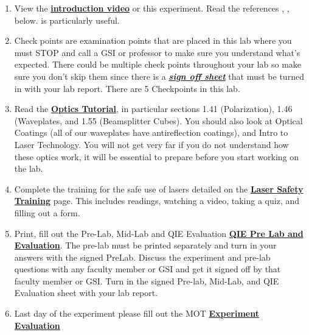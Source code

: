 \documentclass{../lab}
\begin{document}
\begin{enumerate}
    \item View the\textbf{ }\href{http://experimentationlab.berkeley.edu/sites/default/files/QIE/qie\_introduction\_final2.mp4}{\textbf{introduction video}} or this experiment. Read the references \cite{Dehlinger}, \cite{Bell}, \cite{Clauser} below. \cite{Dehlinger} is particularly useful.

    \item Check points are examination points that are placed in this lab where you must STOP and call a GSI or professor to make sure you understand what's expected. There could  be multiple check points throughout your lab so make sure you don't skip them since there is a \emph{\href{http://experimentationlab.berkeley.edu/qiecheckpoints}{\textbf{sign off sheet}}} that must be turned in with your lab report. There are 5 Checkpoints in this lab.

    \item Read the \href{http://experimentationlab.berkeley.edu/sites/default/files/QIE/fundamental-Optics.pdf}{\textbf{Optics Tutorial}}, in particular sections 1.41 (Polarization), 1.46 (Waveplates, and 1.55 (Beamsplitter Cubes). You should also look at Optical Coatings (all of our waveplates have antireflection coatings), and Intro to Laser Technology. You will not get very far if you do not understand how these optics work, it will be essential to prepare before you start working on the lab.

    \item Complete the training for the safe use of lasers detailed on the \href{http://experimentationlab.berkeley.edu/lasersafety}{\textbf{\textbf{Laser Safety Training}}} page. This includes readings, watching a video, taking a quiz, and filling out a form.

    \item Print, fill out the Pre-Lab, Mid-Lab and QIE Evaluation \href{http://experimentationlab.berkeley.edu/qieprelab}{\textbf{QIE Pre Lab and Evaluation}}. The pre-lab must be printed separately and turn in your answers with the signed PreLab. Discuss the experiment and pre-lab questions with any faculty member or GSI and get it signed off by that faculty member or GSI. Turn in the signed Pre-lab, Mid-Lab, and QIE Evaluation sheet with your lab report.

    \item Last day of the experiment please fill out the MOT  \href{\ExperimentEvaluation}{\textbf{Experiment Evaluation}}

\end{enumerate}
\end{document}
